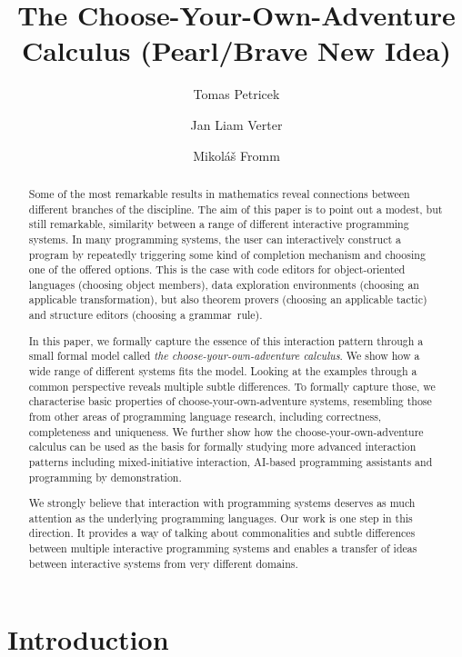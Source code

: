 \documentclass[anonymous, a4paper,UKenglish,cleveref, autoref, thm-restate]{lipics-v2021}
\title{The Choose-Your-Own-Adventure Calculus (Pearl/Brave New Idea)}
\author{Tomas Petricek}{Charles University, Prague, Czechia}{tomas@tomasp.net}{0000-0002-7242-2208}{}
\author{Jan Liam Verter}{Charles University, Prague, Czechia}{todo@todo}{}{}
\author{Mikoláš Fromm}{Charles University, Prague, Czechia}{todo@todo}{}{}
\begin{document}
\maketitle

\begin{abstract}
\noindent
Some of the most remarkable results in mathematics reveal connections between different
branches of the discipline. The aim of this paper is to point out a modest, but still
remarkable, similarity between a range of different interactive programming systems.
%
In many programming systems, the user can interactively construct a program by repeatedly
triggering some kind of completion mechanism and choosing one of the offered options. This
is the case with code editors for object-oriented languages (choosing object members), data
exploration environments (choosing an applicable transformation), but also theorem provers
(choosing an applicable tactic) and structure editors (choosing a grammar~rule).

In this paper, we formally capture the essence of this interaction pattern through a small
formal model called \emph{the choose-your-own-adventure calculus}. We show how a wide range
of different systems fits the model. Looking at the examples through a common perspective
reveals multiple subtle differences. To formally capture those, we characterise
basic properties of choose-your-own-adventure systems, resembling those from other areas
of programming language research, including correctness, completeness and uniqueness.
%
We further show how the choose-your-own-adventure calculus can be used as the basis for
formally studying more advanced interaction patterns including mixed-initiative interaction,
AI-based programming assistants and programming by demonstration.

We strongly believe that interaction with programming systems deserves as much attention
as the underlying programming languages. Our work is one step in this direction. It provides
a way of talking about commonalities and subtle differences between multiple interactive
programming systems and enables a transfer of ideas between interactive systems from very
different domains.

\end{abstract}

\newpage

\section{Introduction}
\end{document}
